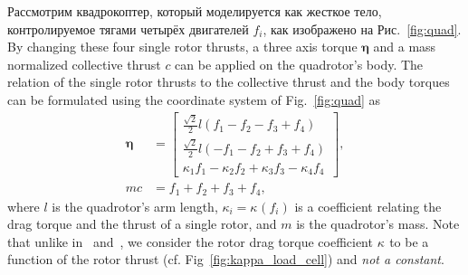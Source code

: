 \documentclass[12pt,a4paper,fleqn]{article}
\newcommand{\bodytorque}[0]{\eta}
\newcommand{\bodytorques}[0]{\boldsymbol{\bodytorque}}
\newcommand{\thrust}[0]{c} %
\newcommand{\rotthrust}[1]{f_{#1}}
\newcommand{\armlength}[0]{l}
\newcommand{\torquecoeff}[1]{\kappa_{#1}}
\newcommand{\mass}[0]{m}
\begin{document}
Рассмотрим квадрокоптер, который моделируется
как жесткое тело, контролируемое тягами 
четырёх двигателей $\rotthrust{i}$, как изображено на Рис.~\ref{fig:quad}.
By changing these four single rotor thrusts, a three axis torque $\bodytorques$ and a mass normalized collective thrust $\thrust$ can be applied on the quadrotor's body.
The relation of the single rotor thrusts to the collective thrust and the body torques can be formulated using the coordinate system of Fig.~\ref{fig:quad} as
%
\begin{align}
	\bodytorques &= \begin{bmatrix} \frac{\sqrt{2}}{2}\armlength(\rotthrust{1} - \rotthrust{2} - \rotthrust{3} + \rotthrust{4}) \\
							\frac{\sqrt{2}}{2}\armlength(-\rotthrust{1} - \rotthrust{2} + \rotthrust{3} + \rotthrust{4}) \\
							\torquecoeff{1}\rotthrust{1} - \torquecoeff{2}\rotthrust{2} + \torquecoeff{3}\rotthrust{3} - \torquecoeff{4}\rotthrust{4}
						\end{bmatrix}, \label{eq:torque_mixing}\\
    \mass \thrust &= \rotthrust{1} + \rotthrust{2} + \rotthrust{3} + \rotthrust{4}, \label{eq:collective_thrust_mixing}
\end{align}
%
where $\armlength$ is the quadrotor's arm length, ${\torquecoeff{i} = \torquecoeff{}(\rotthrust{i})}$ is a coefficient relating the drag torque and the thrust of a single rotor, and $\mass$ is the quadrotor's mass.
Note that unlike in~\cite{Lupashin14mech} and~\cite{Faessler16jfr}, we consider the rotor drag torque coefficient $\torquecoeff{}$ to be a function of the rotor thrust (cf. Fig~\ref{fig:kappa_load_cell}) and \emph{not a constant}.
\end{document}
